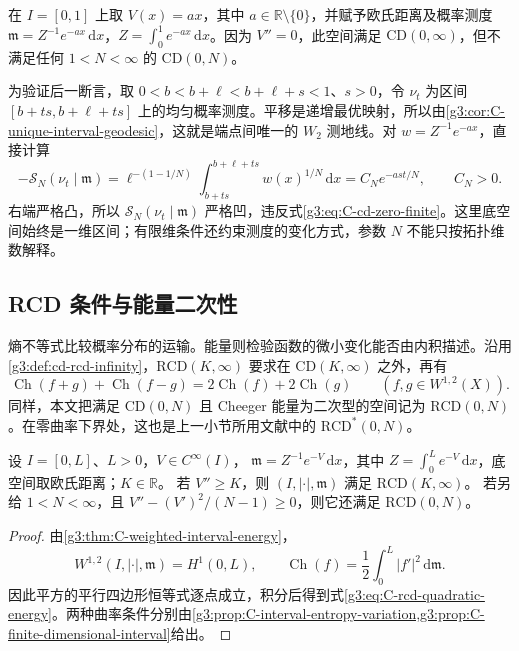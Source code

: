 \begin{example}\label{g3:exm:C-infinite-versus-finite-dimension}
	在 \(I=[0,1]\) 上取 \(V(x)=ax\)，其中 \(a\in\mathbb R\setminus\{0\}\)，并赋予欧氏距离及概率测度 \(\mathfrak m=Z^{-1}e^{-ax}\,\mathrm dx\)，\(Z=\int_0^1e^{-ax}\,\mathrm dx\)。因为 \(V''=0\)，此空间满足 \(\mathrm{CD}(0,\infty)\)，但不满足任何 \(1<N<\infty\) 的 \(\mathrm{CD}(0,N)\)。

	为验证后一断言，取 \(0<b<b+\ell<b+\ell+s<1\)、\(s>0\)，令 \(\nu_t\) 为区间 \([b+ts,b+\ell+ts]\) 上的均匀概率测度。平移是递增最优映射，所以由\cref{g3:cor:C-unique-interval-geodesic}，这就是端点间唯一的 \(W_2\) 测地线。对 \(w=Z^{-1}e^{-ax}\)，直接计算
	\[
		-\mathcal S_N(\nu_t\mid\mathfrak m)
		=\ell^{-(1-1/N)}
		  \int_{b+ts}^{b+\ell+ts}w(x)^{1/N}\,\mathrm dx
		=C_Ne^{-ast/N},\qquad C_N>0.
	\]
	右端严格凸，所以 \(\mathcal S_N(\nu_t\mid\mathfrak m)\) 严格凹，违反式\eqref{g3:eq:C-cd-zero-finite}。这里底空间始终是一维区间；有限维条件还约束测度的变化方式，参数 \(N\) 不能只按拓扑维数解释。
\end{example}

\subsection{RCD 条件与能量二次性}
\label{g3:subsec:C03:02}

熵不等式比较概率分布的运输。能量则检验函数的微小变化能否由内积描述。沿用\cref{g3:def:cd-rcd-infinity}，\(\mathrm{RCD}(K,\infty)\) 要求在 \(\mathrm{CD}(K,\infty)\) 之外，再有
\begin{equation}\label{g3:eq:C-rcd-quadratic-energy}
	\operatorname{Ch}(f+g)+\operatorname{Ch}(f-g)
	    =2\operatorname{Ch}(f)+2\operatorname{Ch}(g)
	    \qquad(f,g\in W^{1,2}(X)).
\end{equation}
同样，本文把满足 \(\mathrm{CD}(0,N)\) 且 Cheeger 能量为二次型的空间记为
\(\mathrm{RCD}(0,N)\)。在零曲率下界处，这也是上一小节所用文献中的 \(\mathrm{RCD}^*(0,N)\)。

\begin{corollary}\label{g3:cor:C-weighted-interval-rcd}
	设 \(I=[0,L]\)、\(L>0\)，\(V\in C^\infty(I)\)，
	\(\mathfrak m=Z^{-1}e^{-V}\,\mathrm dx\)，其中 \(Z=\int_0^Le^{-V}\,\mathrm dx\)，底空间取欧氏距离；\(K\in\mathbb R\)。
	若 \(V''\ge K\)，则 \((I,|\cdot|,\mathfrak m)\) 满足
	\(\mathrm{RCD}(K,\infty)\)。
	若另给 \(1<N<\infty\)，且
	\(V''-(V')^2/(N-1)\ge0\)，则它还满足 \(\mathrm{RCD}(0,N)\)。
\end{corollary}
\begin{proof}
	由\cref{g3:thm:C-weighted-interval-energy}，
	\[
		W^{1,2}(I,|\cdot|,\mathfrak m)=H^1(0,L),\qquad
		\operatorname{Ch}(f)=\frac12\int_0^L|f'|^2\,\mathrm d\mathfrak m.
	\]
	因此平方的平行四边形恒等式逐点成立，积分后得到式\eqref{g3:eq:C-rcd-quadratic-energy}。两种曲率条件分别由\cref{g3:prop:C-interval-entropy-variation,g3:prop:C-finite-dimensional-interval}给出。
\end{proof}

